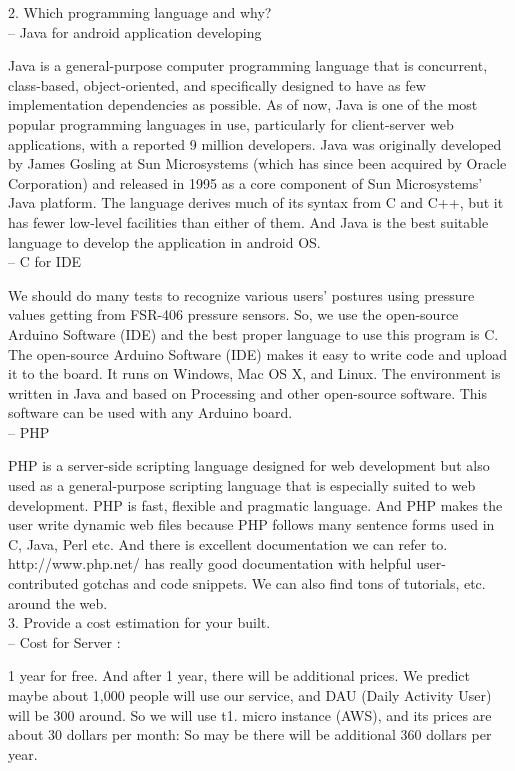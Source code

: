\documentclass[conference]{IEEEtran}
\begin{document}
2.	Which programming language and why?\\

-- Java for android application developing

Java is a general-purpose computer programming language that is concurrent, class-based, object-oriented, and specifically designed to have as few implementation dependencies as possible. As of now, Java is one of the most popular programming languages in use, particularly for client-server web applications, with a reported 9 million developers. Java was originally developed by James Gosling at Sun Microsystems (which has since been acquired by Oracle Corporation) and released in 1995 as a core component of Sun Microsystems' Java platform. The language derives much of its syntax from C and C++, but it has fewer low-level facilities than either of them. And Java is the best suitable language to develop the application in android OS.\\

-- C for IDE

We should do many tests to recognize various users' postures using pressure values getting from FSR-406 pressure sensors. So, we use the open-source Arduino Software (IDE) and the best proper language to use this program is C. The open-source Arduino Software (IDE) makes it easy to write code and upload it to the board. It runs on Windows, Mac OS X, and Linux. The environment is written in Java and based on Processing and other open-source software. This software can be used with any Arduino board.\\

-- PHP

PHP is a server-side scripting language designed for web development but also used as a general-purpose scripting language that is especially suited to web development. PHP is fast, flexible and pragmatic language. And PHP makes the user write dynamic web files because PHP follows many sentence forms used in C, Java, Perl etc. And there is excellent documentation we can refer to. http://www.php.net/ has really good documentation with helpful user-contributed gotchas and code snippets. We can also find tons of tutorials, etc. around the web.\\

3.	Provide a cost estimation for your built.\\

-- Cost for Server :

1 year for free. And after 1 year, there will be additional prices. We predict maybe about 1,000 people will use our service, and DAU (Daily Activity User) will be 300 around. So we will use t1. micro instance (AWS), and its prices are about 30 dollars per month: So may be there will be additional 360 dollars per year.\\
\end{document}
